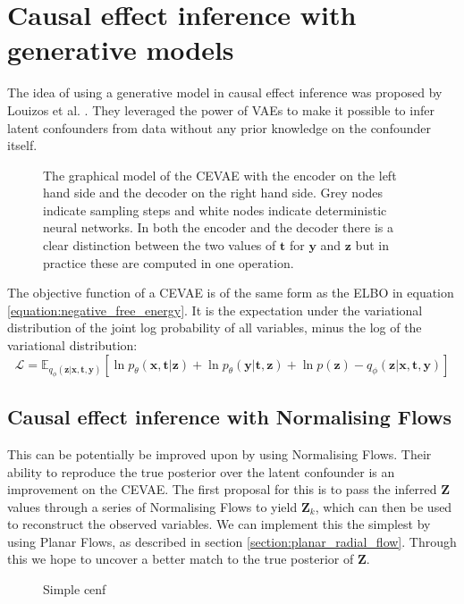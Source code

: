 \documentclass{report}
\newcommand{\E}{\mathbb{E}}
\newcommand{\bt}{\mathbf{t}}
\newcommand{\bx}{\mathbf{x}}
\newcommand{\by}{\mathbf{y}}
\newcommand{\bZ}{\mathbf{Z}}
\newcommand{\bz}{\mathbf{z}}
\begin{document}

\chapter{Causal effect inference with generative models}
The idea of using a generative model in causal effect inference was proposed by Louizos et al. \cite{louizos2017causal}. They leveraged the power of VAEs to make it possible to infer latent confounders from data without any prior knowledge on the confounder itself.

\begin{figure}
    \centering
    
    
    \caption{The graphical model of the CEVAE with the encoder on the left hand side and the decoder on the right hand side. Grey nodes indicate sampling steps and white nodes indicate deterministic neural networks. In both the encoder and the decoder there is a clear distinction between the two values of $\bt$ for $\by$ and $\bz$ but in practice these are computed in one operation.}%
    \label{fig:cevae_graphical_model}
\end{figure}

The objective function of a CEVAE is of the same form as the ELBO in equation  \ref{equation:negative_free_energy}. It is the expectation under the variational distribution of the joint log probability of all variables, minus the log of the variational distribution:
\begin{equation}
    \mathcal{L} = \E_{q_\phi(\bz|\bx, \bt, \by)}[\ln p_\theta(\bx, \bt | \bz) + \ln p_\theta(\by |\bt, \bz) +\ln p(\bz) - q_\phi(\bz | \bx, \bt, \by)]
\end{equation}

\section{Causal effect inference with Normalising Flows}
This can be potentially be improved upon by using Normalising Flows. Their ability to reproduce the true posterior over the latent confounder is an improvement on the CEVAE. The first proposal for this is to pass the inferred $\bZ$ values through a series of Normalising Flows to yield $\bZ_k$, which can then be used to reconstruct the observed variables. We can implement this the simplest by using Planar Flows, as described in section \ref{section:planar_radial_flow}. Through this we hope to uncover a better match to the true posterior of $\bZ$.


\begin{figure}
    \centering
    
    \caption{Simple cenf}
    \label{fig:cenf_with_vae}
\end{figure}




\end{document}
